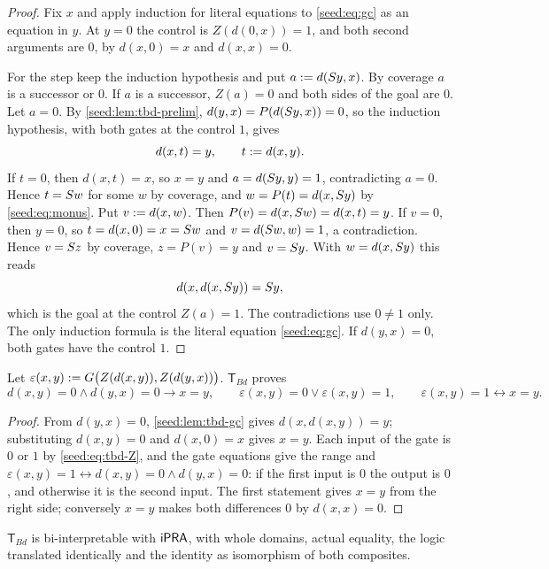 \begin{proof}
Fix $x$ and apply induction for literal equations to \eqref{seed:eq:gc} as
an equation in $y$. At $y=0$ the control is $Z(d(0,x))=1$, and both second
arguments are $0$, by $d(x,0)=x$ and $d(x,x)=0$.

For the step keep the induction hypothesis and put $a\mathrel{:=} d(S y,x)$. By
coverage $a$ is a successor or $0$. If $a$ is a successor, $Z(a)=0$ and both
sides of the goal are $0$. Let $a=0$. By \cref{seed:lem:tbd-prelim},
$d(y,x)=P(d(S y,x))=0$, so the induction hypothesis, with both gates at
the control $1$, gives
\[
 d(x,t)=y,\qquad t\mathrel{:=} d(x,y).
\]
If $t=0$, then $d(x,t)=x$, so $x=y$ and $a=d(S y,y)=1$, contradicting
$a=0$. Hence $t=S w$ for some $w$ by coverage, and
$w=P(t)=d(x,S y)$ by \eqref{seed:eq:monus}. Put $v\mathrel{:=} d(x,w)$. Then
$P(v)=d(x,S w)=d(x,t)=y$. If $v=0$, then $y=0$, so
$t=d(x,0)=x=S w$ and $v=d(S w,w)=1$, a contradiction. Hence
$v=S z$ by coverage, $z=P(v)=y$ and $v=S y$. With $w=d(x,S y)$
this reads
\[
 d(x,d(x,S y))=S y,
\]
which is the goal at the control $Z(a)=1$. The contradictions use
$0\neq1$ only. The only induction formula is the literal equation
\eqref{seed:eq:gc}. If $d(y,x)=0$, both gates have the control $1$.
\end{proof}

\begin{theorem}\label{seed:thm:tbd-reflect}
Let $\varepsilon(x,y)\mathrel{:=} G\bigl(Z(d(x,y)),Z(d(y,x))\bigr)$.
$\mathsf{T}_{Bd}$ proves
\[
 d(x,y)=0\land d(y,x)=0\to x=y,\qquad
 \varepsilon(x,y)=0\lor\varepsilon(x,y)=1,\qquad
 \varepsilon(x,y)=1\leftrightarrow x=y .
\]
\end{theorem}

\begin{proof}
From $d(y,x)=0$, \cref{seed:lem:tbd-gc} gives $d(x,d(x,y))=y$; substituting
$d(x,y)=0$ and $d(x,0)=x$ gives $x=y$. Each input of the gate is $0$ or $1$
by \eqref{seed:eq:tbd-Z}, and the gate equations give the range and
$\varepsilon(x,y)=1\leftrightarrow d(x,y)=0\land d(y,x)=0$: if the first
input is $0$ the output is $0$, and otherwise it is the second input. The
first statement gives $x=y$ from the right side; conversely $x=y$ makes both
differences $0$ by $d(x,x)=0$.
\end{proof}

\begin{corollary}\label{seed:cor:tbd-biint}
$\mathsf{T}_{Bd}$ is bi-interpretable with $\mathsf{iPRA}$, with whole domains,
actual equality, the logic translated identically and the identity as
isomorphism of both composites.
\end{corollary}

